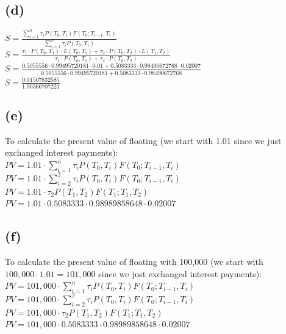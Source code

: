 \documentclass{article}
\begin{document}
{\subsection*{(d)}

$S = \frac{\sum_{i=1}^{n} \tau_i P(T_0, T_i) F(T_0; T_{i-1}, T_i)}{\sum_{i=1}^{n} \tau_i P(T_0, T_i)}$ \\
$S = \frac{\tau_1 \cdot P(T_0, T_1) \cdot L(T_0, T_1) + \tau_2 \cdot P(T_0, T_2) \cdot L(T_1, T_2)}{\tau_1 \cdot P(T_0, T_1) + \tau_2 \cdot P(T_0, T_2)}$ \\
$S = \frac{0.5055556 \cdot 0.99495720181 \cdot 0.01 + 0.5083333 \cdot 0.98490672768 \cdot 0.02007}{0.5055556 \cdot 0.99495720181 + 0.5083333 \cdot 0.98490672768}$ \\
$S = \frac{0.01507832585}{1.00366707221}$ \\

\subsection*{(e)}

To calculate the present value of floating (we start with 1.01 since we just exchanged interest payments): \\
$PV = 1.01 \cdot \sum_{i=1}^{n} \tau_i P(T_0, T_i) F(T_0; T_{i-1}, T_i)$ \\
$PV = 1.01 \cdot \sum_{i=2}^{2} \tau_i P(T_0, T_i) F(T_0; T_{i-1}, T_i)$ \\
$PV = 1.01 \cdot \tau_2 P(T_1, T_2) F(T_1; T_1, T_2)$ \\
$PV = 1.01 \cdot 0.5083333 \cdot  0.98989858648 \cdot 0.02007$ \\

\subsection*{(f)}

To calculate the present value of floating with 100,000 (we start with $100,000 \cdot 1.01 = 101,000$ since we just exchanged interest payments): \\
$PV = 101,000 \cdot \sum_{i=1}^{n} \tau_i P(T_0, T_i) F(T_0; T_{i-1}, T_i)$ \\
$PV = 101,000 \cdot \sum_{i=2}^{2} \tau_i P(T_0, T_i) F(T_0; T_{i-1}, T_i)$ \\
$PV = 101,000 \cdot \tau_2 P(T_1, T_2) F(T_1; T_1, T_2)$ \\
$PV = 101,000 \cdot 0.5083333 \cdot 0.98989858648 \cdot 0.02007$ \\

}
\end{document}
